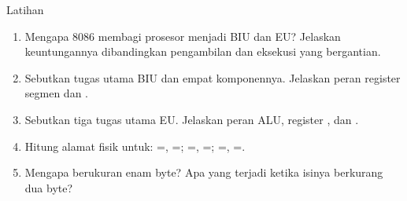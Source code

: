 \documentclass[aspectratio=169,11pt]{beamer}
\begin{document}
\begin{frame}{Latihan}
\small
\begin{enumerate}
    \item Mengapa 8086 membagi prosesor menjadi BIU dan EU?
          Jelaskan keuntungannya dibandingkan pengambilan dan
          eksekusi yang bergantian.

    \vspace{0.15em}
    \item Sebutkan tugas utama BIU dan empat komponennya. Jelaskan
          peran register segmen dan .

    \vspace{0.15em}
    \item Sebutkan tiga tugas utama EU. Jelaskan peran ALU,
          register , dan .

    \vspace{0.15em}
    \item Hitung alamat fisik untuk:
          =, =;
          =, =;
          =, =.

    \vspace{0.15em}
    \item Mengapa  berukuran enam byte? Apa yang terjadi
          ketika isinya berkurang dua byte?
\end{enumerate}
\end{frame}
\end{document}
